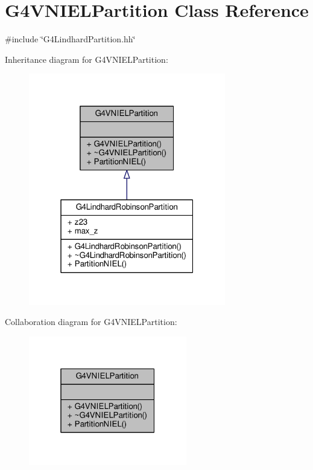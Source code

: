 \hypertarget{classG4VNIELPartition}{}\section{G4\+V\+N\+I\+E\+L\+Partition Class Reference}
\label{classG4VNIELPartition}


{\ttfamily \#include \char`\"{}G4\+Lindhard\+Partition.\+hh\char`\"{}}



Inheritance diagram for G4\+V\+N\+I\+E\+L\+Partition\+:
\nopagebreak
\begin{figure}[H]
\begin{center}
\leavevmode
\includegraphics[width=244pt]{classG4VNIELPartition__inherit__graph}
\end{center}
\end{figure}


Collaboration diagram for G4\+V\+N\+I\+E\+L\+Partition\+:
\nopagebreak
\begin{figure}[H]
\begin{center}
\leavevmode
\includegraphics[width=196pt]{classG4VNIELPartition__coll__graph}
\end{center}
\end{figure}
